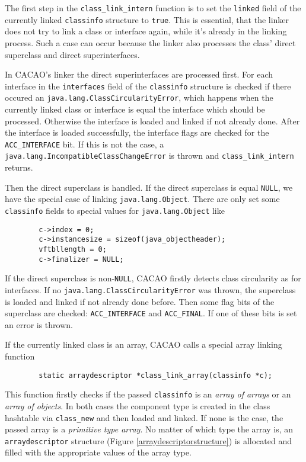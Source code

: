 The first step in the \texttt{class\_link\_intern} function is to set
the \texttt{linked} field of the currently linked \texttt{classinfo}
structure to \texttt{true}. This is essential, that the linker does
not try to link a class or interface again, while it's already in the
linking process. Such a case can occur because the linker also
processes the class' direct superclass and direct superinterfaces.

In CACAO's linker the direct superinterfaces are processed first. For
each interface in the \texttt{interfaces} field of the
\texttt{classinfo} structure is checked if there occured an
\texttt{java.lang.ClassCircularityError}, which happens when the
currently linked class or interface is equal the interface which
should be processed. Otherwise the interface is loaded and linked if
not already done. After the interface is loaded successfully, the
interface flags are checked for the \texttt{ACC\_INTERFACE} bit. If
this is not the case, a
\texttt{java.lang.IncompatibleClassChangeError} is thrown and
\texttt{class\_link\_intern} returns.

Then the direct superclass is handled. If the direct superclass is
equal \texttt{NULL}, we have the special case of linking
\texttt{java.lang.Object}. There are only set some \texttt{classinfo}
fields to special values for \texttt{java.lang.Object} like

\begin{verbatim}
        c->index = 0;
        c->instancesize = sizeof(java_objectheader);
        vftbllength = 0;
        c->finalizer = NULL;
\end{verbatim}

If the direct superclass is non-\texttt{NULL}, CACAO firstly detects
class circularity as for interfaces. If no
\texttt{java.lang.ClassCircularityError} was thrown, the superclass is
loaded and linked if not already done before. Then some flag bits of
the superclass are checked: \texttt{ACC\_INTERFACE} and
\texttt{ACC\_FINAL}. If one of these bits is set an error is thrown.

If the currently linked class is an array, CACAO calls a special array
linking function

\begin{verbatim}
        static arraydescriptor *class_link_array(classinfo *c);
\end{verbatim}

This function firstly checks if the passed \texttt{classinfo} is an
\textit{array of arrays} or an \textit{array of objects}. In both
cases the component type is created in the class hashtable via
\texttt{class\_new} and then loaded and linked. If none is the case,
the passed array is a \textit{primitive type array}. No matter of
which type the array is, an \texttt{arraydescriptor} structure (Figure
\ref{arraydescriptorstructure}) is allocated and filled with the
appropriate values of the array type.

